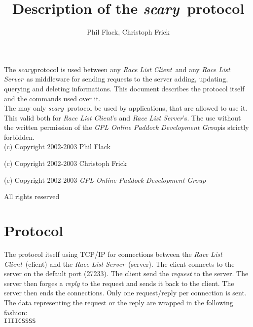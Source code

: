 \documentclass[a4paper,10pt]{article}
\newcommand{\scary}{{\it scary}}
\newcommand{\rls}{{\it Race List Server}}
\newcommand{\rlc}{{\it Race List Client}}
\newcommand{\gplopdev}{{\it GPL Online Paddock Development Group}}
\newcommand{\scaryport}{27233}
\begin{document}
\title{Description of the \scary\ protocol}
\author{Phil Flack, Christoph Frick}

\maketitle

\vspace{2in}

\abstract

The \scary protocol is used between any \rlc\ and any \rls\ as middleware for
sending requests to the server adding, updating, querying and deleting
informations. This document describes the protocol itself and the commands
used over it.\\

The may only \scary\ protocol be used by applications, that are allowed to use
it. This valid both for \rlc's and \rls's. The use without the written
permission of the \gplopdev is strictly forbidden.\\

(c) Copyright 2002-2003 Phil Flack

(c) Copyright 2002-2003 Christoph Frick

(c) Copyright 2002-2003 \gplopdev

All rights reserved

\newpage


\section{Protocol}

The protocol itself using TCP/IP for connections between the \rlc\ (client) and
the \rls\ (server). The client connects to the server on the default port
(\scaryport). The client send the {\it request} to the server. The server then
forges a {\it reply} to the request and sends it back to the client. The
server then ends the connections. Only one request/reply per connection is
sent.\\

The data representing the request or the reply are wrapped in the following
fashion:\\

{\tt IIIICSSSS}\\
\end{document}
